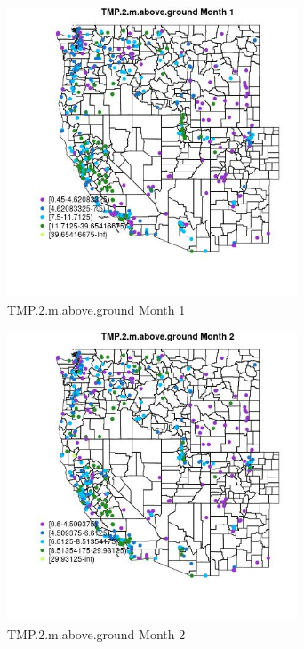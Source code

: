 \begin{figure} 
\centering  
\includegraphics[width=0.77\textwidth]{Code_Outputs/ML_input_report_ML_input_PM25_Step5_part_d_de_duplicated_aves_ML_input_MapObsMo1TMP2maboveground.jpg} 
\caption{\label{fig:ML_input_report_ML_input_PM25_Step5_part_d_de_duplicated_aves_ML_inputMapObsMo1TMP2maboveground}TMP.2.m.above.ground Month 1} 
\end{figure} 
 

\begin{figure} 
\centering  
\includegraphics[width=0.77\textwidth]{Code_Outputs/ML_input_report_ML_input_PM25_Step5_part_d_de_duplicated_aves_ML_input_MapObsMo2TMP2maboveground.jpg} 
\caption{\label{fig:ML_input_report_ML_input_PM25_Step5_part_d_de_duplicated_aves_ML_inputMapObsMo2TMP2maboveground}TMP.2.m.above.ground Month 2} 
\end{figure} 
 


